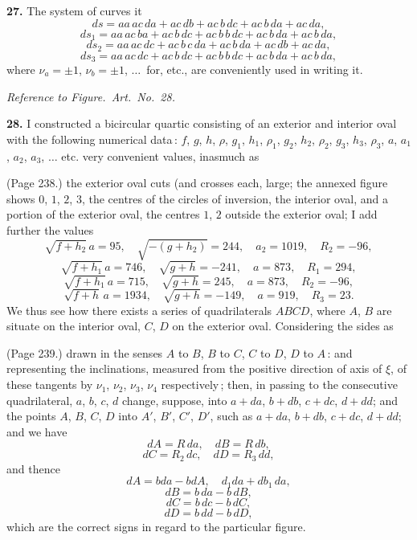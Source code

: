 \documentclass[11pt,a4paper]{article}
\theoremstyle{plain}
\theoremstyle{definition}
\begin{document}
\medskip

\noindent\textbf{27.} The system of curves it
\[
ds = a a\,a c\,d a + a c\,d b + a c\,b\,d c + a c\,b\,d a + a c\,d a,
\]
\[
ds_1 = a a\,a c\,b a + a c\,b\,d c + a c\,b\,b\,d c + a c\,b\,d a + a c\,b\,d a,
\]
\[
ds_2 = a a\,a c\,d c + a c\,b\,c\,d a + a c\,b\,d a + a c\,d b + a c\,d a,
\]
\[
ds_3 = a a\,a c\,d c + a c\,b\,d c + a c\,b\,b\,d c + a c\,b\,d a + a c\,b\,d a,
\]
where $\nu_a = \pm 1$, $\nu_b = \pm 1$, $\ldots$\ for, etc., are conveniently used in writing it.

\medskip

\noindent\textit{Reference to Figure.\ Art.\ No.\ 28.}

\medskip

\noindent\textbf{28.} I constructed a bicircular quartic consisting of an exterior and interior oval with the following numerical data\,: $f$, $g$, $h$, $\rho$, $g_1$, $h_1$, $\rho_1$, $g_2$, $h_2$, $\rho_2$, $g_3$, $h_3$, $\rho_3$, $a$, $a_1$, $a_2$, $a_3$, $\ldots$ etc. very convenient values, inasmuch as

\medskip

\noindent (Page 238.) the exterior oval cuts (and crosses each, large; the annexed figure shows $0$, $1$, $2$, $3$, the centres of the circles of inversion, the interior oval, and a portion of the exterior oval, the centres $1$, $2$ outside the exterior oval; I add further the values
\[
\sqrt{f + h_2}\,a = 95, \quad \sqrt{-( g + h_2)} = 244, \quad a_2 = 1019, \quad R_2 = -96,
\]
\[
\sqrt{f + h_1}\,a = 746, \quad \sqrt{g + h} = -241, \quad a = 873, \quad R_1 = 294,
\]
\[
\sqrt{f + h_1}\,a = 715, \quad \sqrt{g + h} = 245, \quad a = 873, \quad R_2 = -96,
\]
\[
\sqrt{f + h}\,a = 1934, \quad \sqrt{g + h} = -149, \quad a = 919, \quad R_3 = 23.
\]
We thus see how there exists a series of quadrilaterals $ABCD$, where $A$, $B$ are situate on the interior oval, $C$, $D$ on the exterior oval. Considering the sides as

\medskip

\noindent (Page 239.) drawn in the senses $A$ to $B$, $B$ to $C$, $C$ to $D$, $D$ to $A$\,: and representing the inclinations, measured from the positive direction of axis of $\xi$, of these tangents by $\nu_1$, $\nu_2$, $\nu_3$, $\nu_4$ respectively\,; then, in passing to the consecutive quadrilateral, $a$, $b$, $c$, $d$ change, suppose, into $a + da$, $b + db$, $c + dc$, $d + dd$; and the points $A$, $B$, $C$, $D$ into $A'$, $B'$, $C'$, $D'$, such as $a + da$, $b + db$, $c + dc$, $d + dd$; and we have
\[
d A = R\,da, \quad dB = R\,db,
\]
\[
dC = R_2\,dc, \quad d D = R_3\,dd,
\]
and thence
\[
dA = b da - b dA, \quad d_1 d a + db_1\,d a,
\]
\[
dB = b\,da - b\,d B,
\]
\[
dC = b\,dc - b\,d C,
\]
\[
dD = b\,dd - b\,d D,
\]
which are the correct signs in regard to the particular figure.
\end{document}
